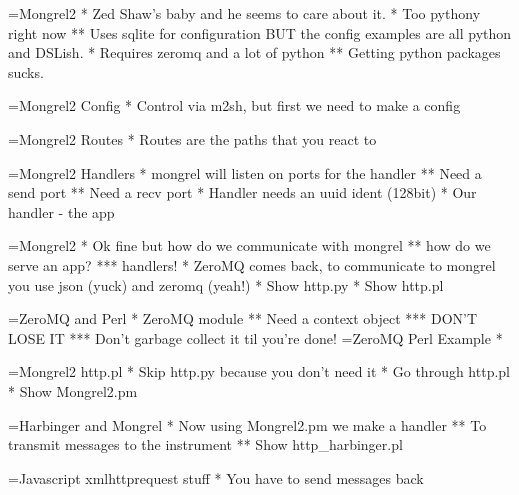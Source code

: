 \documentclass[titlepage,usenames,a4,landscape,semhelv]{seminar}
\begin{document}
\begin{slide}
=Mongrel2
* Zed Shaw's baby and he seems to care about it.
* Too pythony right now
** Uses sqlite for configuration BUT the config examples are all
python and DSLish.
* Requires zeromq and a lot of python 
** Getting python packages sucks.

=Mongrel2 Config
* Control via m2sh, but first we need to make a config

=Mongrel2 Routes
* Routes are the paths that you react to

=Mongrel2 Handlers
* mongrel will listen on ports for the handler
** Need a send port 
** Need a recv port
* Handler needs an uuid ident (128bit)
* Our handler - the app

=Mongrel2
* Ok fine but how do we communicate with mongrel
** how do we serve an app?
*** handlers!
* ZeroMQ comes back, to communicate to mongrel you use json (yuck) and
zeromq (yeah!)
* Show http.py 
* Show http.pl 


=ZeroMQ and Perl
* ZeroMQ module
** Need a context object 
*** DON'T LOSE IT
*** Don't garbage collect it til you're done!
=ZeroMQ Perl Example
* 

=Mongrel2 http.pl
* Skip http.py because you don't need it
* Go through http.pl
* Show Mongrel2.pm

=Harbinger and Mongrel
* Now using Mongrel2.pm we make a handler
** To transmit messages to the instrument
** Show http\_harbinger.pl

=Javascript xmlhttprequest stuff
* You have to send messages back


\end{slide}
\end{document}
